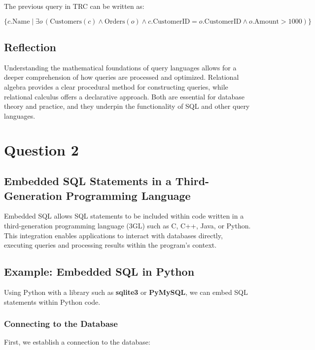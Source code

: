 \documentclass[12pt]{article}
\begin{document}
The previous query in TRC can be written as:

\[
\{ c.\text{Name} \mid \exists o \, ( \text{Customers}(c) \land \text{Orders}(o) \land c.\text{CustomerID} = o.\text{CustomerID} \land o.\text{Amount} > 1000 ) \}
\]

\subsection*{Reflection}

Understanding the mathematical foundations of query languages allows for a deeper comprehension of how queries are processed and optimized. Relational algebra provides a clear procedural method for constructing queries, while relational calculus offers a declarative approach. Both are essential for database theory and practice, and they underpin the functionality of SQL and other query languages.

\newpage

\section*{Question 2}


\subsection*{Embedded SQL Statements in a Third-Generation Programming Language}

Embedded SQL allows SQL statements to be included within code written in a third-generation programming language (3GL) such as C, C++, Java, or Python. This integration enables applications to interact with databases directly, executing queries and processing results within the program's context.

\subsection*{Example: Embedded SQL in Python}

Using Python with a library such as \textbf{sqlite3} or \textbf{PyMySQL}, we can embed SQL statements within Python code.

\subsubsection*{Connecting to the Database}

First, we establish a connection to the database:
\end{document}
